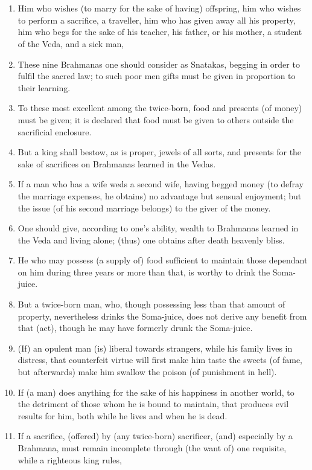 \chapter{}
\begin{enumerate}
\item Him who wishes (to marry for the sake of having) offspring, him who wishes to perform a sacrifice, a traveller, him who has given away all his property, him who begs for the sake of his teacher, his father, or his mother, a student of the Veda, and a sick man,
\item These nine Brahmanas one should consider as Snatakas, begging in order to fulfil the sacred law; to such poor men gifts must be given in proportion to their learning.
\item To these most excellent among the twice-born, food and presents (of money) must be given; it is declared that food must be given to others outside the sacrificial enclosure.
\item But a king shall bestow, as is proper, jewels of all sorts, and presents for the sake of sacrifices on Brahmanas learned in the Vedas.
\item If a man who has a wife weds a second wife, having begged money (to defray the marriage expenses, he obtains) no advantage but sensual enjoyment; but the issue (of his second marriage belongs) to the giver of the money.
\item One should give, according to one's ability, wealth to Brahmanas learned in the Veda and living alone; (thus) one obtains after death heavenly bliss.
\item He who may possess (a supply of) food sufficient to maintain those dependant on him during three years or more than that, is worthy to drink the Soma-juice.
\item But a twice-born man, who, though possessing less than that amount of property, nevertheless drinks the Soma-juice, does not derive any benefit from that (act), though he may have formerly drunk the Soma-juice.
\item (If) an opulent man (is) liberal towards strangers, while his family lives in distress, that counterfeit virtue will first make him taste the sweets (of fame, but afterwards) make him swallow the poison (of punishment in hell).
\item If (a man) does anything for the sake of his happiness in another world, to the detriment of those whom he is bound to maintain, that produces evil results for him, both while he lives and when he is dead.
\item If a sacrifice, (offered) by (any twice-born) sacrificer, (and) especially by a Brahmana, must remain incomplete through (the want of) one requisite, while a righteous king rules,

\end{enumerate}
